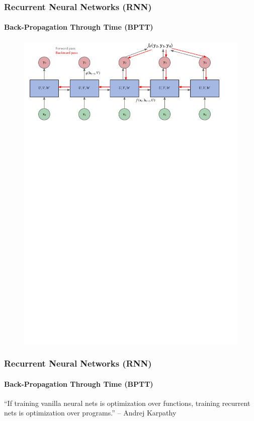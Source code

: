 \documentclass[german,aspectratio=169]{beamer}
\begin{document}
\begin{frame}
	\frametitle{Recurrent Neural Networks (RNN)}
	\framesubtitle{Back-Propagation Through Time (BPTT)}
	\begin{figure}
		\includegraphics[width=1.0\textwidth]{bbtt}
	\end{figure}
\end{frame}


\begin{frame}
		\frametitle{Recurrent Neural Networks (RNN)}
		\framesubtitle{Back-Propagation Through Time (BPTT)}
		\begin{quoting}
		``If training vanilla neural nets is optimization over functions, training recurrent nets is optimization over programs.'' -- Andrej Karpathy
	\end{quoting}
\end{frame}
\end{document}

